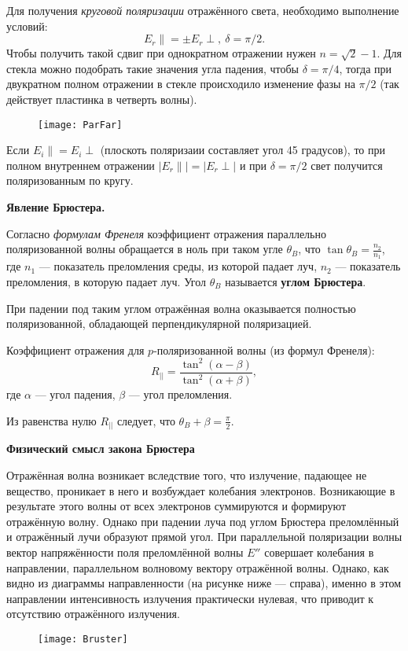 		Для получения \textit{круговой поляризации} отражённого света, необходимо выполнение условий: $$E_r\parallel = \pm E_r\perp, \ \delta = \pi/2.$$
		Чтобы получить такой сдвиг при однократном отражении нужен $n = \sqrt2 - 1.$
		Для стекла можно подобрать такие значения угла падения, чтобы $\delta = \pi/4$, тогда при двукратном полном отражении в стекле происходило изменение фазы на $\pi/2$ (так действует пластинка в четверть волны).
		
	\begin{figure}[H]
	\centering
	\texttt{[image: ParFar]}
    \end{figure}
Если $E_i\parallel = E_i\perp$ (плоскоть поляризаии составляет угол 45 градусов), то при полном внутреннем отражении $|E_r\parallel| = |E_r\perp|$ и при $\delta = \pi/2$ свет получится поляризованным по кругу.

\textbf{Явление Брюстера.}

Согласно \textit{формулам Френеля} коэффициент отражения параллельно поляризованной волны обращается в ноль при таком угле $\theta_B$, что $\tan{\theta_B = \frac{n_2}{n_1}}$, где $n_1$ --- показатель преломления среды, из которой падает луч, $n_2$ --- показатель преломления, в которую падает луч. Угол $\theta_B$ называется \textbf{углом Брюстера}.

	При падении под таким углом отражённая волна оказывается полностью поляризованной, обладающей перпендикулярной поляризацией.
	
	Коэффициент отражения для $p$-поляризованной волны (из формул Френеля):
	$$R_{||} = \frac{\tan^2{(\alpha - \beta)}}{\tan^2{(\alpha + \beta)}}, $$
	где  $\alpha$ --- угол падения, $\beta$ --- угол преломления.
	
	Из равенства нулю $R_{||}$ следует, что $\theta_B + \beta = \frac{\pi}{2}$.
	
	\textbf{Физический смысл закона Брюстера}
	
	Отражённая волна возникает вследствие того, что излучение, падающее не вещество, проникает в него и возбуждает колебания электронов. Возникающие в результате этого волны от всех электронов суммируются и формируют отражённую волну. Однако при падении луча под углом Брюстера преломлённый и отражённый лучи образуют прямой угол. При параллельной поляризации волны вектор напряжённости поля преломлённой волны $E''$ совершает колебания в направлении, параллельном волновому вектору отражённой волны. Однако, как видно из диаграммы направленности (на рисунке ниже --- справа), именно в этом направлении интенсивность излучения практически нулевая, что приводит к отсутствию отражённого излучения.
	\begin{figure}[H]
		\centering
		\texttt{[image: Bruster]}
	\end{figure}

